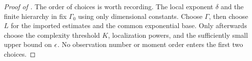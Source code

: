 \begin{proof}[Proof of ]
The order of choices is worth recording.  The local exponent
\(\delta\) and the finite hierarchy in
 fix \(\Gamma_0\) using only
dimensional constants.  Choose \(\Gamma\), then choose
\(L\) for the imported estimates and the common exponential
base.  Only afterwards choose the complexity threshold
\(K\), localization powers, and the sufficiently small
upper bound on \(\epsilon\).  No observation number or moment
order enters the first two choices.
\end{proof}

